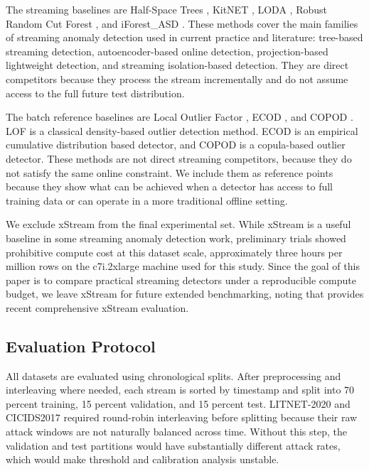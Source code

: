 \documentclass[preprint,12pt,authoryear]{elsarticle}
\begin{document}
The streaming baselines are Half-Space Trees \citep{tan2011fast}, KitNET \citep{mirsky2018kitsune}, LODA \citep{pevny2016loda}, Robust Random Cut Forest \citep{guha2016robust}, and iForest\_ASD \citep{ding2013iforestasd}. These methods cover the main families of streaming anomaly detection used in current practice and literature: tree-based streaming detection, autoencoder-based online detection, projection-based lightweight detection, and streaming isolation-based detection. They are direct competitors because they process the stream incrementally and do not assume access to the full future test distribution.

The batch reference baselines are Local Outlier Factor \citep{breunig2000lof}, ECOD \citep{li2022ecod}, and COPOD \citep{li2020copod}. LOF is a classical density-based outlier detection method. ECOD is an empirical cumulative distribution based detector, and COPOD is a copula-based outlier detector. These methods are not direct streaming competitors, because they do not satisfy the same online constraint. We include them as reference points because they show what can be achieved when a detector has access to full training data or can operate in a more traditional offline setting.

We exclude xStream \citep{manzoor2018xstream} from the final experimental set. While xStream is a useful baseline in some streaming anomaly detection work, preliminary trials showed prohibitive compute cost at this dataset scale, approximately three hours per million rows on the c7i.2xlarge machine used for this study. Since the goal of this paper is to compare practical streaming detectors under a reproducible compute budget, we leave xStream for future extended benchmarking, noting that \citet{cao2025revisiting} provides recent comprehensive xStream evaluation.

\subsection{Evaluation Protocol}
\label{sec:exp-protocol}

All datasets are evaluated using chronological splits. After preprocessing and interleaving where needed, each stream is sorted by timestamp and split into 70 percent training, 15 percent validation, and 15 percent test. LITNET-2020 and CICIDS2017 required round-robin interleaving before splitting because their raw attack windows are not naturally balanced across time. Without this step, the validation and test partitions would have substantially different attack rates, which would make threshold and calibration analysis unstable.
\end{document}

